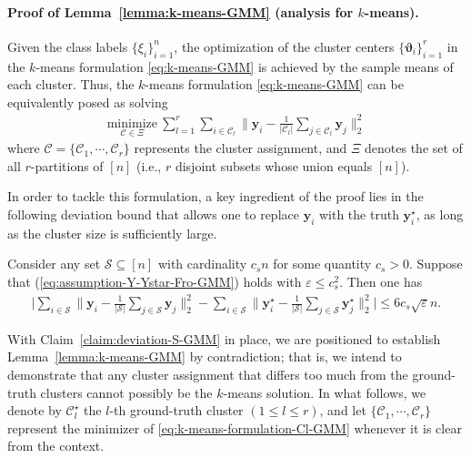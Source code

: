 \paragraph{Proof of Lemma~\ref{lemma:k-means-GMM} (analysis for $k$-means).}

Given the class labels $\{\xi_i\}_{i=1}^n$, the optimization of the cluster centers  $\{\bm{\vartheta}_i\}_{i=1}^r$ in the $k$-means formulation \eqref{eq:k-means-GMM} is achieved by the sample means of each cluster. Thus, the $k$-means formulation \eqref{eq:k-means-GMM} can be equivalently posed as solving
%
\begin{align}
	 \underset{\mathcal{C}\in\Xi}{
		 \mathrm{minimize}} ~ \sum_{l=1}^{r} \sum_{i\in\mathcal{C}_{l}}\Big\|\bm{y}_{i}-\frac{1}{|\mathcal{C}_{l}|}\sum_{j\in\mathcal{C}_{l}}\bm{y}_{j}\Big\|_{2}^{2}
	\label{eq:k-means-formulation-Cl-GMM}
\end{align}
%
where $\mathcal{C}=\{\mathcal{C}_{1},\cdots,\mathcal{C}_{r}\}$ represents the cluster assignment,
and $\Xi$ denotes the set of all $r$-partitions of $[n]$ (i.e., $r$ disjoint subsets whose union equals $[n]$).

In order to tackle this formulation, a key ingredient of the proof lies in the following deviation bound that allows one to replace $\bm{y}_{i}$ with the truth $\bm{y}_{i}^{\star}$,
as long as the cluster size is sufficiently large.
%
\begin{claim}
\label{claim:deviation-S-GMM}
Consider any set $\mathcal{S}\subseteq[n]$ with cardinality $c_{s}n$ for some quantity $c_s >0$.
Suppose that (\ref{eq:assumption-Y-Ystar-Fro-GMM}) holds with $\varepsilon\leq c_{s}^{2}$. Then one has
%
\begin{align}
	\Bigg|\sum_{i\in\mathcal{S}}\Big\|\bm{y}_{i}-\frac{1}{|\mathcal{S}|}\sum_{j\in\mathcal{S}}\bm{y}_{j}\Big\|_{2}^{2}-\sum_{i\in\mathcal{S}}\Big\|\bm{y}_{i}^{\star}-\frac{1}{|\mathcal{S}|}\sum_{j\in\mathcal{S}}\bm{y}_{j}^{\star}\Big\|_{2}^{2} \Bigg|
	\leq  6 c_{s}\sqrt{\varepsilon}n.
	\label{eq:claim:deviation-S-GMM}
\end{align}
%
\end{claim}
%
With Claim~\ref{claim:deviation-S-GMM} in place, we are positioned to establish Lemma~\ref{lemma:k-means-GMM}  by contradiction; that is, we intend to demonstrate that any cluster assignment that differs too much from the ground-truth clusters cannot possibly be the $k$-means solution.
In what follows, we denote by $\mathcal{C}_{l}^{\star}$ the $l$-th ground-truth cluster $(1\leq l\leq r)$,
and let $\{\mathcal{C}_{1},\cdots,\mathcal{C}_{r}\}$ represent the minimizer of \eqref{eq:k-means-formulation-Cl-GMM} whenever it is clear from the context.



